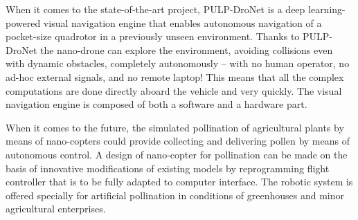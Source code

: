 When it comes to the state-of-the-art project, PULP-DroNet is a deep learning-powered visual navigation engine that enables autonomous navigation of a pocket-size quadrotor in a previously unseen environment. Thanks to PULP-DroNet the nano-drone can explore the environment, avoiding collisions even with dynamic obstacles, completely autonomously -- with no human operator, no ad-hoc external signals, and no remote laptop! This means that all the complex computations are done directly aboard the vehicle and very quickly. The visual navigation engine is composed of both a software and a hardware part. \cite{Niculescu2021}

When it comes to the future, the simulated pollination of agricultural plants by means of nano-copters could provide collecting and delivering pollen by means of autonomous control. A design of nano-copter for pollination can be made on the basis of innovative modifications of existing models by reprogramming flight controller that is to be fully adapted to computer interface. The robotic system is offered specially for artificial pollination in conditions of greenhouses and minor agricultural enterprises. \cite{Abutalipov2016}
